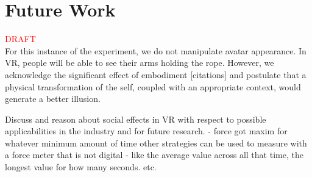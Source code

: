 \section{Future Work}
\textcolor{red}{DRAFT}\\


For this instance of the experiment, we do not manipulate avatar appearance. In VR, people will be able to see their arms holding the rope. However, we acknowledge the significant effect of embodiment [citations] and postulate that a physical transformation of the self, coupled with an appropriate context, would generate a better illusion.

Discuss and reason about social effects in VR with respect to possible applicabilities in
the industry and for future research.
- force got maxim for whatever minimum amount of time other strategies can be used to measure with a force meter that is not digital - like the average value across all that time, the longest value for how many seconds. etc.
